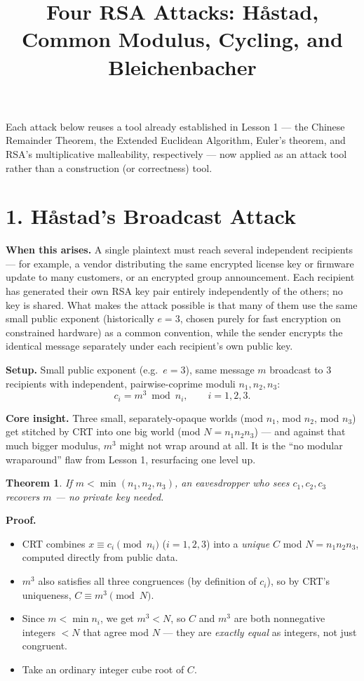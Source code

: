 \documentclass[11pt]{article}
\title{\textbf{Four RSA Attacks: Håstad, Common Modulus, Cycling, and Bleichenbacher}}
\author{}
\date{}
\newtheorem{theorem}{Theorem}
\begin{document}
\maketitle
\vspace{-1.5em}

Each attack below reuses a tool already established in Lesson 1 --- the Chinese Remainder Theorem, the Extended Euclidean Algorithm, Euler's theorem, and RSA's multiplicative malleability, respectively --- now applied as an attack tool rather than a construction (or correctness) tool.

\hrulefill

\section*{1. Håstad's Broadcast Attack}

\textbf{When this arises.} A single plaintext must reach several independent recipients --- for example, a vendor distributing the same encrypted license key or firmware update to many customers, or an encrypted group announcement. Each recipient has generated their own RSA key pair entirely independently of the others; no key is shared. What makes the attack possible is that many of them use the same small public exponent (historically $e=3$, chosen purely for fast encryption on constrained hardware) as a common convention, while the sender encrypts the identical message separately under each recipient's own public key.

\textbf{Setup.} Small public exponent (e.g.\ $e=3$), same message $m$ broadcast to 3 recipients with independent, pairwise-coprime moduli $n_1,n_2,n_3$:
\[
c_i = m^3 \bmod n_i, \qquad i=1,2,3.
\]

\textbf{Core insight.} Three small, separately-opaque worlds (mod $n_1$, mod $n_2$, mod $n_3$) get stitched by CRT into one big world (mod $N=n_1n_2n_3$) --- and against that much bigger modulus, $m^3$ might not wrap around at all. It is the ``no modular wraparound'' flaw from Lesson 1, resurfacing one level up.

\begin{theorem}
If $m<\min(n_1,n_2,n_3)$, an eavesdropper who sees $c_1,c_2,c_3$ recovers $m$ --- no private key needed.
\end{theorem}

\textbf{Proof.}
\begin{itemize}[nosep]
\item CRT combines $x\equiv c_i\pmod{n_i}$ ($i=1,2,3$) into a \emph{unique} $C$ mod $N=n_1n_2n_3$, computed directly from public data.
\item $m^3$ also satisfies all three congruences (by definition of $c_i$), so by CRT's uniqueness, $C\equiv m^3\pmod N$.
\item Since $m<\min n_i$, we get $m^3<N$, so $C$ and $m^3$ are both nonnegative integers $<N$ that agree mod $N$ --- they are \emph{exactly equal} as integers, not just congruent.
\item Take an ordinary integer cube root of $C$.
\end{itemize}
\end{document}
